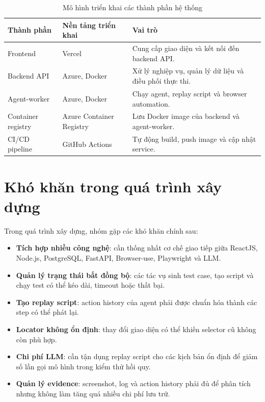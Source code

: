 \begin{table}[H]
\centering
\caption{Mô hình triển khai các thành phần hệ thống}
\label{tab:chapter5_deployment_model}
\renewcommand{\arraystretch}{1.2}
\begin{tabular}{|p{4.0cm}|p{4.2cm}|p{6.0cm}|}
\hline
\textbf{Thành phần} &
\textbf{Nền tảng triển khai} &
\textbf{Vai trò} \\
\hline

Frontend &
Vercel &
Cung cấp giao diện và kết nối đến backend API. \\
\hline

Backend API &
Azure, Docker &
Xử lý nghiệp vụ, quản lý dữ liệu và điều phối thực thi. \\
\hline

Agent-worker &
Azure, Docker &
Chạy agent, replay script và browser automation. \\
\hline

Container registry &
Azure Container Registry &
Lưu Docker image của backend và agent-worker. \\
\hline

CI/CD pipeline &
GitHub Actions &
Tự động build, push image và cập nhật service. \\
\hline
\end{tabular}
\end{table}

\section{Khó khăn trong quá trình xây dựng}

Trong quá trình xây dựng, nhóm gặp các khó khăn chính sau:

\begin{itemize}
    \item \textbf{Tích hợp nhiều công nghệ}: cần thống nhất cơ chế giao tiếp giữa ReactJS, Node.js, PostgreSQL, FastAPI, Browser-use, Playwright và LLM.
    
    \item \textbf{Quản lý trạng thái bất đồng bộ}: các tác vụ sinh test case, tạo script và chạy test có thể kéo dài, timeout hoặc thất bại.
    
    \item \textbf{Tạo replay script}: action history của agent phải được chuẩn hóa thành các step có thể phát lại.
    
    \item \textbf{Locator không ổn định}: thay đổi giao diện có thể khiến selector cũ không còn phù hợp.
    
    \item \textbf{Chi phí LLM}: cần tận dụng replay script cho các kịch bản ổn định để giảm số lần gọi mô hình trong kiểm thử hồi quy.
    
    \item \textbf{Quản lý evidence}: screenshot, log và action history phải đủ để phân tích nhưng không làm tăng quá nhiều chi phí lưu trữ.
\end{itemize}

